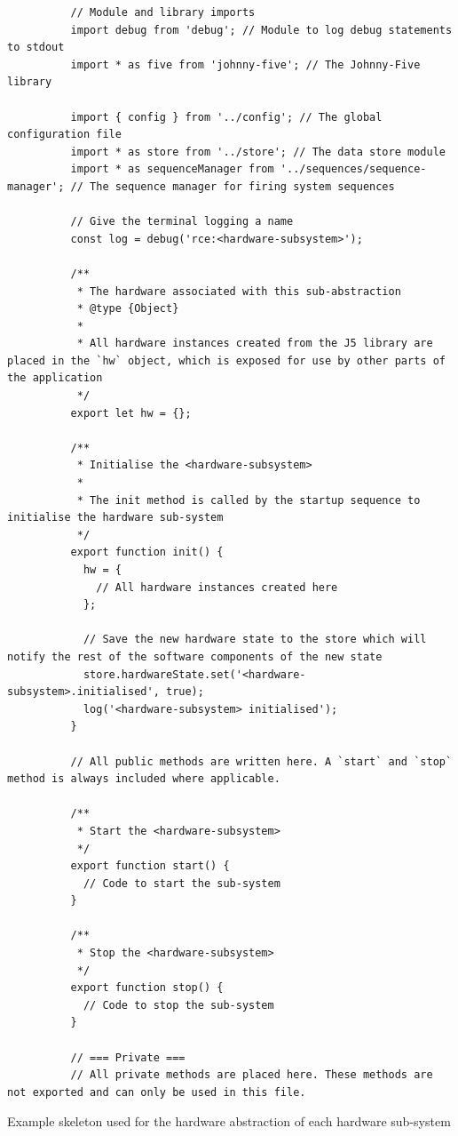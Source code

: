       \begin{code}
        \begin{verbatim}
          // Module and library imports
          import debug from 'debug'; // Module to log debug statements to stdout
          import * as five from 'johnny-five'; // The Johnny-Five library
          
          import { config } from '../config'; // The global configuration file
          import * as store from '../store'; // The data store module
          import * as sequenceManager from '../sequences/sequence-manager'; // The sequence manager for firing system sequences
          
          // Give the terminal logging a name
          const log = debug('rce:<hardware-subsystem>');
          
          /**
           * The hardware associated with this sub-abstraction
           * @type {Object}
           *
           * All hardware instances created from the J5 library are placed in the `hw` object, which is exposed for use by other parts of the application
           */
          export let hw = {};
          
          /**
           * Initialise the <hardware-subsystem>
           *
           * The init method is called by the startup sequence to initialise the hardware sub-system
           */
          export function init() {         
            hw = {
              // All hardware instances created here
            };
            
            // Save the new hardware state to the store which will notify the rest of the software components of the new state
            store.hardwareState.set('<hardware-subsystem>.initialised', true);
            log('<hardware-subsystem> initialised');
          }
          
          // All public methods are written here. A `start` and `stop` method is always included where applicable.
          
          /**
           * Start the <hardware-subsystem>
           */
          export function start() {
            // Code to start the sub-system
          }
          
          /**
           * Stop the <hardware-subsystem>
           */
          export function stop() {
            // Code to stop the sub-system
          }
          
          // === Private ===
          // All private methods are placed here. These methods are not exported and can only be used in this file.
        \end{verbatim}
        \caption{Example skeleton used for the hardware abstraction of each hardware sub-system}
        \label{code:exampleHwAbstractionSkeleton}
      \end{code}
      
